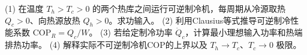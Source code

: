 (1) 在温度 \(T_h>T_c>0\) 的两个热库之间运行可逆制冷机，每周期从冷源取热 \(Q_c>0\)、向热源放热 \(Q_h>0\)。求功输入。
(2) 利用Clausius等式推导可逆制冷性能系数 \(\mathrm{COP}_R=Q_c/W\)。
(3) 若给定制冷功率 \(\dot Q_c\)，计算最小理想输入功率和热端排热功率。
(4) 解释实际不可逆制冷机COP的上界以及 \(T_h\to T_c\)、\(T_c\to0\) 极限。
